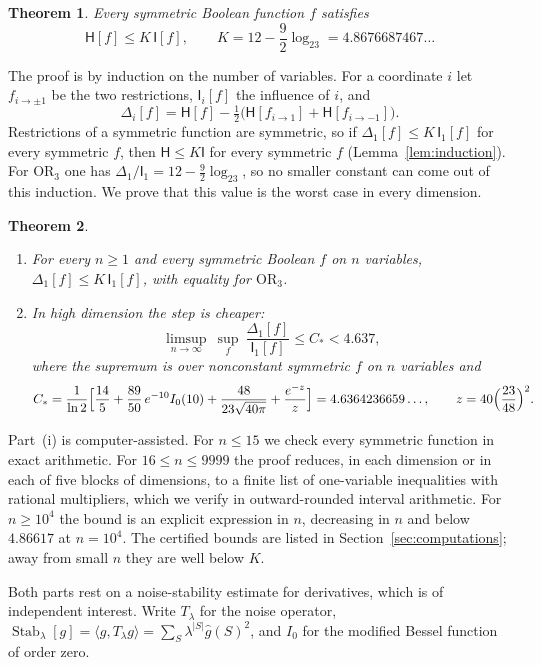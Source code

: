\documentclass[11pt]{amsart}
\newtheorem{mainthm}{Theorem}
\theoremstyle{definition}
\theoremstyle{remark}
\newcommand{\HH}{\mathsf H}
\newcommand{\I}{\mathsf I}
\newcommand{\wh}[1]{\widehat{#1}}
\DeclareMathOperator{\Stab}{Stab}
\begin{document}
\begin{mainthm}\label{thm:main}
Every symmetric Boolean function $f$ satisfies
\[
 \HH[f]\le K\,\I[f],\qquad K=12-\frac92\log_23=4.8676687467\ldots
\]
\end{mainthm}

The proof is by induction on the number of variables. For a coordinate $i$ let $f_{i\to\pm1}$ be the two restrictions, $\I_i[f]$ the influence of $i$, and
\[
 \Delta_i[f]=\HH[f]-\tfrac12\bigl(\HH[f_{i\to1}]+\HH[f_{i\to-1}]\bigr).
\]
Restrictions of a symmetric function are symmetric, so if $\Delta_1[f]\le K\,\I_1[f]$ for every symmetric $f$, then $\HH\le K\I$ for every symmetric $f$ (Lemma~\ref{lem:induction}). For $\mathrm{OR}_3$ one has $\Delta_1/\I_1=12-\frac92\log_23$, so no smaller constant can come out of this induction. We prove that this value is the worst case in every dimension.

\begin{mainthm}\label{thm:restriction}
\begin{enumerate}[label=\textup{(\roman*)}]
\item For every $n\ge1$ and every symmetric Boolean $f$ on $n$ variables, $\Delta_1[f]\le K\,\I_1[f]$, with equality for $\mathrm{OR}_3$.
\item In high dimension the step is cheaper:
\[
 \limsup_{n\to\infty}\ \sup_{f}\ \frac{\Delta_1[f]}{\I_1[f]}\le C_*<4.637,
\]
where the supremum is over nonconstant symmetric $f$ on $n$ variables and
\[
 C_*=\frac{1}{\ln2}\Bigl[\frac{14}{5}+\frac{89}{50}\,e^{-10}I_0(10)+\frac{48}{23\sqrt{40\pi}}+\frac{e^{-z}}{z}\Bigr]=4.6364236659\ldots,\qquad z=40\Bigl(\frac{23}{48}\Bigr)^2.
\]
\end{enumerate}
\end{mainthm}

Part~(i) is computer-assisted. For $n\le15$ we check every symmetric function in exact arithmetic. For $16\le n\le9999$ the proof reduces, in each dimension or in each of five blocks of dimensions, to a finite list of one-variable inequalities with rational multipliers, which we verify in outward-rounded interval arithmetic. For $n\ge10^4$ the bound is an explicit expression in $n$, decreasing in $n$ and below $4.86617$ at $n=10^4$. The certified bounds are listed in Section~\ref{sec:computations}; away from small $n$ they are well below $K$.

Both parts rest on a noise-stability estimate for derivatives, which is of independent interest. Write $T_\lambda$ for the noise operator, $\Stab_\lambda[g]=\langle g,T_\lambda g\rangle=\sum_S\lambda^{|S|}\wh g(S)^2$, and $I_0$ for the modified Bessel function of order zero.
\end{document}
